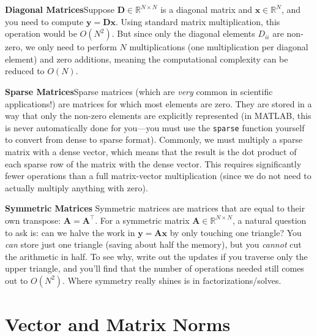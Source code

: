 \textbf{Diagonal Matrices}\quad Suppose $ \mathbf{D} \in \mathbb{R}^{N \times N} $ is a diagonal matrix and $\mathbf{x}\in \mathbb{R}^N$, and you need to compute $ \mathbf{y} = \mathbf{D}\mathbf{x} $. Using standard matrix multiplication, this operation would be $ O(N^2) $. But since only the diagonal elements $ D_{ii} $ are non-zero, we only need to perform $ N $ multiplications (one multiplication per diagonal element) and zero additions, meaning the computational complexity can be reduced to $ O(N) $.

\textbf{Sparse Matrices}\quad Sparse matrices (which are \textit{very} common in scientific applications!) are matrices for which most elements are zero. They are stored in a way that only the non-zero elements are explicitly represented (in MATLAB, this is never automatically done for you---you must use the \verb|sparse| function yourself to convert from dense to sparse format). Commonly, we must multiply a sparse matrix with a dense vector, which means that the result is the dot product of each sparse row of the matrix with the dense vector. This requires significantly fewer operations than a full matrix-vector multiplication (since we do not need to actually multiply anything with zero).

\textbf{Symmetric Matrices}\quad
Symmetric matrices are matrices that are equal to their own transpose: $ \mathbf{A} = \mathbf{A}^\top $. For a symmetric matrix $ \mathbf{A} \in \mathbb{R}^{N\times N} $, a natural question to ask is: can we halve the work in $\mathbf{y}=\mathbf{A}\mathbf{x}$ by only touching one triangle?  You \emph{can} store just one triangle (saving about half the memory), but you \emph{cannot} cut the arithmetic in half. To see why, write out the updates if you traverse only the upper triangle, and you'll find that the number of operations needed still comes out to $O(N^2)$. Where symmetry really shines is in factorizations/solves.


\section{Vector and Matrix Norms}

